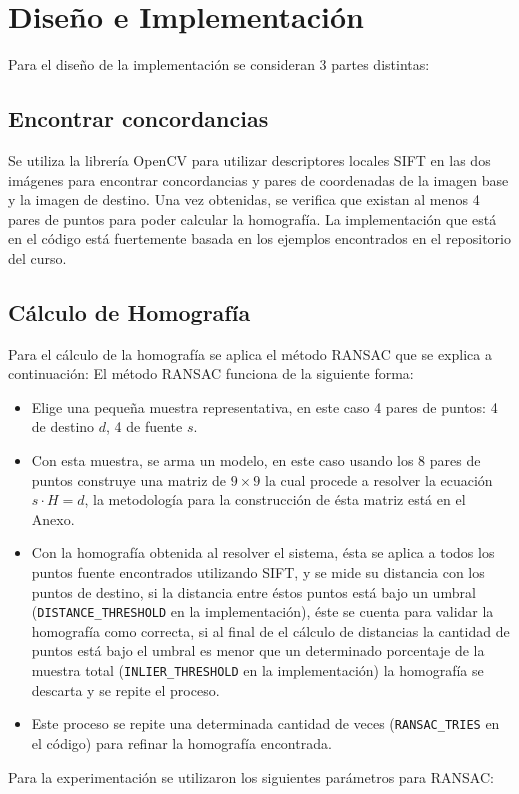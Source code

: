 \documentclass[conference]{IEEEtran}
\begin{document}
\section*{Diseño e Implementación}
	Para el diseño de la implementación se consideran 3 partes distintas:
	\subsection*{Encontrar concordancias}
		Se utiliza la librería OpenCV para utilizar descriptores locales SIFT en las dos imágenes para encontrar concordancias y pares de coordenadas de la imagen base y la imagen de destino. Una vez obtenidas, se verifica que existan al menos 4 pares de puntos para poder calcular la homografía. La implementación que está en el código está fuertemente basada en los ejemplos encontrados en el repositorio del curso.
	\subsection*{Cálculo de Homografía}
		Para el cálculo de la homografía se aplica el método RANSAC que se explica a continuación:
		El método RANSAC funciona de la siguiente forma:
		\begin{itemize}
			\item Elige una pequeña muestra representativa, en este caso 4 pares de puntos: 4 de destino $d$, 4 de fuente $s$.
			\item Con esta muestra, se arma un modelo, en este caso usando los 8 pares de puntos construye una matriz de $9 \times 9$ la cual procede a resolver la ecuación $s \cdot H = d$, la metodología para la construcción de ésta matriz está en el Anexo.
			\item Con la homografía obtenida al resolver el sistema, ésta se aplica a todos los puntos fuente encontrados utilizando SIFT, y se mide su distancia con los puntos de destino, si la distancia entre éstos puntos está bajo un umbral (\texttt{DISTANCE_THRESHOLD} en la implementación), éste se cuenta para validar la homografía como correcta, si al final de el cálculo de distancias la cantidad de puntos está bajo el umbral es menor que un determinado porcentaje de la muestra total (\texttt{INLIER_THRESHOLD} en la implementación) la homografía se descarta y se repite el proceso.
			\item Este proceso se repite una determinada cantidad de veces (\texttt{RANSAC_TRIES} en el código) para refinar la homografía encontrada.
		\end{itemize}
		Para la experimentación se utilizaron los siguientes parámetros para RANSAC:
\end{document}
